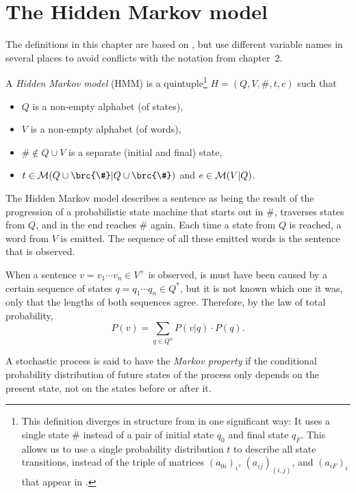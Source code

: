 \chapter{The Hidden Markov model}

The definitions in this chapter are based on \cite[pp.~210]{jm09}, but use
different variable names in several places to avoid conflicts with the notation
from chapter~2.

\begin{definition}
 A \emph{Hidden Markov model} (HMM) is a quintuple\footnote{This definition
 diverges in structure from \cite{jm09} in one significant way: It uses a
 single state $\#$ instead of a pair of initial state $q_0$ and final state
 $q_F$. This allows us to use a single probability distribution $t$ to describe
 all state transitions, instead of the triple of matrices $(a_{0i})_i$,
 $(a_{ij})_{(i,j)}$, and $(a_{iF})_i$ that appear in \cite{jm09}.} $H =
 (Q,V,\#,t,e)$ such that
 \begin{itemize}\setlength\itemsep{-0.3em}
  \item $Q$ is a non-empty alphabet (of states),
  \item $V$ is a non-empty alphabet (of words),
  \item $\#\notin Q\cup V$ is a separate (initial and final) state,
  \item $t\in\um(Q\cup\brc{\#}|Q\cup\brc{\#})$ and $e\in\mathcal M(V|Q)$. \qedhere
 \end{itemize}
\end{definition}

The Hidden Markov model describes a sentence as being the result of the
progression of a probabilistic state machine that starts out in $\#$, traverses
states from $Q$, and in the end reaches $\#$ again. Each time a state from $Q$
is reached, a word from $V$ is emitted. The sequence of all these emitted words
is the sentence that is observed.

When a sentence $v = v_1\cdots v_n\in V^+$ is observed, is must have been
caused by a certain sequence of states $q = q_1\cdots q_n\in Q^*$, but it is
not known which one it was, only that the lengths of both sequences agree.
Therefore, by the law of total probability,
\[
 P(v) = \sum_{q\in Q^n} P(v|q) \cdot P(q).
\]

\begin{definition}
 A stochastic process is said to have the \emph{Markov property} if the
 conditional probability distribution of future states of the process only
 depends on the present state, not on the states before or after it.
\end{definition}

